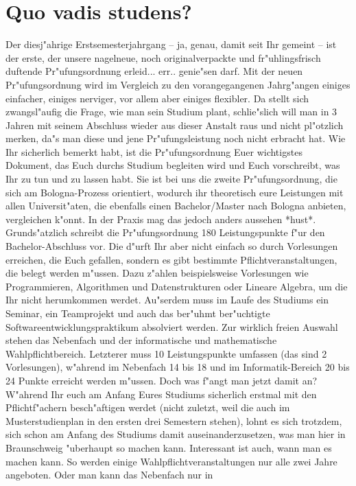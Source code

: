 \section{Quo vadis studens?}

Der diesj"ahrige Erstsemesterjahrgang – ja, genau, damit seit Ihr gemeint – ist der erste, der unsere
nagelneue, noch originalverpackte und fr"uhlingsfrisch duftende Pr"ufungsordnung erleid... err..
genie"sen darf. Mit der neuen Pr"ufungsordnung wird im Vergleich zu den vorangegangenen
Jahrg"angen einiges einfacher, einiges nerviger, vor allem aber einiges flexibler. Da stellt sich
zwangsl"aufig die Frage, wie man sein Studium plant, schlie"slich will man in 3 Jahren mit seinem
Abschluss wieder aus dieser Anstalt raus und nicht pl"otzlich merken, da"s man diese und jene
Pr"ufungsleistung noch nicht erbracht hat.
Wie Ihr sicherlich bemerkt habt, ist die Pr"ufungsordnung Euer wichtigstes Dokument, das Euch
durchs Studium begleiten wird und Euch vorschreibt, was Ihr zu tun und zu lassen habt. Sie ist bei
uns die zweite Pr"ufungsordnung, die sich am Bologna-Prozess orientiert, wodurch ihr theoretisch
eure Leistungen mit allen Universit"aten, die ebenfalls einen Bachelor/Master nach Bologna
anbieten, vergleichen k"onnt. In der Praxis mag das jedoch anders aussehen *hust*.
Grunds"atzlich schreibt die Pr"ufungsordnung 180 Leistungspunkte f"ur den Bachelor-Abschluss vor.
Die d"urft Ihr aber nicht einfach so durch Vorlesungen erreichen, die Euch gefallen, sondern es gibt
bestimmte Pflichtveranstaltungen, die belegt werden m"ussen. Dazu z"ahlen beispielsweise
Vorlesungen wie Programmieren, Algorithmen und Datenstrukturen oder Lineare Algebra, um die
Ihr nicht herumkommen werdet. Au"serdem muss im Laufe des Studiums ein Seminar, ein
Teamprojekt und auch das ber"uhmt ber"uchtigte Softwareentwicklungspraktikum absolviert werden.
Zur wirklich freien Auswahl stehen das Nebenfach und der informatische und mathematische
Wahlpflichtbereich. Letzterer muss 10 Leistungspunkte umfassen (das sind 2 Vorlesungen),
w"ahrend im Nebenfach 14 bis 18 und im Informatik-Bereich 20 bis 24 Punkte erreicht werden
m"ussen.
Doch was f"angt man jetzt damit an? W"ahrend Ihr euch am Anfang Eures Studiums sicherlich
erstmal mit den Pflichtf"achern besch"aftigen werdet (nicht zuletzt, weil die auch im
Musterstudienplan in den ersten drei Semestern stehen), lohnt es sich trotzdem, sich schon am
Anfang des Studiums damit auseinanderzusetzen, was man hier in Braunschweig "uberhaupt so
machen kann. Interessant ist auch, wann man es machen kann. So werden einige
Wahlpflichtveranstaltungen nur alle zwei Jahre angeboten. Oder man kann das Nebenfach nur in
